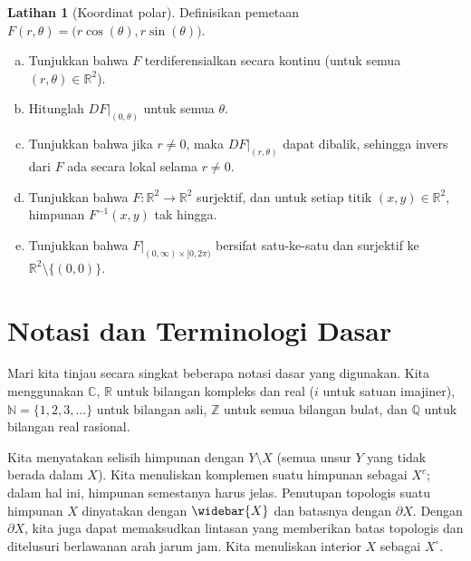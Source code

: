 \documentclass[12pt,openany]{book}
\newcommand{\C}{{\mathbb{C}}}
\newcommand{\R}{{\mathbb{R}}}
\newcommand{\Z}{{\mathbb{Z}}}
\newcommand{\N}{{\mathbb{N}}}
\newcommand{\Q}{{\mathbb{Q}}}
\theoremstyle{plain}
\theoremstyle{remark}
\theoremstyle{definition}
\newenvironment{exbox}{%
    \def\FrameCommand{\vrule width 1pt \relax\hspace{10pt}}%
    \MakeFramed{\advance\hsize-\width\FrameRestore}%
}{%
    \endMakeFramed
}
\newenvironment{exparts}{%
    \leavevmode\begin{enumerate}[a),noitemsep,topsep=0pt,parsep=0pt,partopsep=0pt]
}{%
    \end{enumerate}
}
\theoremstyle{exercise}
\newtheorem{exercise}{Latihan}[section]
\theoremstyle{example}
\begin{document}
\begin{exbox}
\begin{exercise}[Koordinat polar]%
\label{mv:exercise:polarcoordinates}
\pagebreak[3]
Definisikan pemetaan $F(r,\theta) = \bigl(r \cos(\theta), r \sin(\theta) \bigr)$.
\begin{exparts}
\item
Tunjukkan bahwa $F$ terdiferensialkan secara kontinu (untuk semua $(r,\theta) \in
\R^2$).
\item
Hitunglah $DF|_{(0,\theta)}$ untuk semua $\theta$.
\item
Tunjukkan bahwa jika $r \neq 0$, maka $DF|_{(r,\theta)}$ dapat dibalik, sehingga invers
dari $F$ ada secara lokal selama $r \neq 0$.
\item
Tunjukkan bahwa $F \colon \R^2 \to \R^2$ surjektif, dan untuk setiap titik $(x,y) \in
\R^2$, himpunan $F^{-1}(x,y)$ tak hingga.
\item
Tunjukkan bahwa $F|_{(0,\infty) \times [0,2\pi)}$ bersifat satu-ke-satu dan surjektif ke
$\R^2 \setminus \bigl\{ (0,0) \bigr\}$.
\end{exparts}
\end{exercise}
\end{exbox}


\chapter{Notasi dan Terminologi Dasar} \label{ap:basicnotation}


Mari kita tinjau secara singkat beberapa notasi dasar yang digunakan.
Kita menggunakan $\C$, $\R$ untuk bilangan kompleks dan real ($i$ untuk satuan imajiner),
$\N = \{ 1,2,3, \ldots \}$ untuk bilangan asli,
$\Z$ untuk semua bilangan bulat, dan $\Q$ untuk bilangan real rasional.

%
Kita menyatakan selisih himpunan dengan
$Y \setminus X$ (semua unsur
$Y$ yang tidak berada dalam $X$).
%
Kita menuliskan komplemen suatu himpunan sebagai $X^c$; dalam hal ini,
himpunan semestanya harus jelas.
%
Penutupan topologis suatu himpunan $X$ dinyatakan dengan $\widebar{X}$ dan
batasnya dengan
%
$\partial X$.  Dengan $\partial X$, kita juga dapat memaksudkan lintasan yang memberikan
batas topologis dan ditelusuri berlawanan arah jarum jam.
Kita menuliskan interior $X$ sebagai
%
$X^\circ$.
\end{document}
